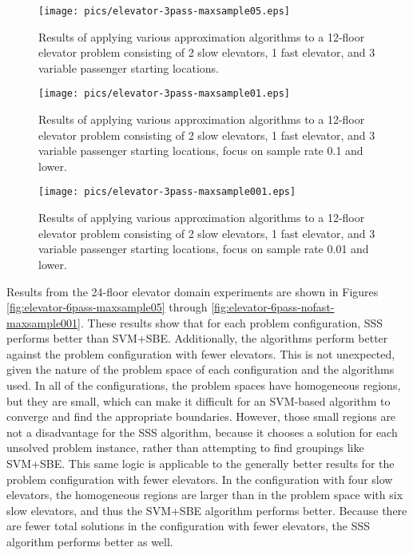 \begin{figure}
\begin{center}
\texttt{[image: pics/elevator-3pass-maxsample05.eps]}
\caption{Results of applying various approximation algorithms to a 12-floor elevator problem consisting of 2 slow elevators, 1 fast elevator, and 3 variable passenger starting locations.}
\label{fig:elevator-3pass-maxsample05}
\end{center}
\end{figure}

\begin{figure}
\begin{center}
\texttt{[image: pics/elevator-3pass-maxsample01.eps]}
\caption{Results of applying various approximation algorithms to a 12-floor elevator problem consisting of 2 slow elevators, 1 fast elevator, and 3 variable passenger starting locations, focus on sample rate 0.1 and lower.}
\label{fig:elevator-3pass-maxsample01}
\end{center}
\end{figure}

\begin{figure}
\begin{center}
\texttt{[image: pics/elevator-3pass-maxsample001.eps]}
\caption{Results of applying various approximation algorithms to a 12-floor elevator problem consisting of 2 slow elevators, 1 fast elevator, and 3 variable passenger starting locations, focus on sample rate 0.01 and lower.}
\label{fig:elevator-3pass-maxsample001}
\end{center}
\end{figure}





Results from the 24-floor elevator domain experiments are shown in Figures \ref{fig:elevator-6pass-maxsample05} through \ref{fig:elevator-6pass-nofast-maxsample001}.  These results show that for each problem configuration, SSS performs better than SVM+SBE.  Additionally, the algorithms perform better against the problem configuration with fewer elevators.  This is not unexpected,  given the nature of the problem space of each configuration and the algorithms used.  In all of the configurations, the problem spaces have homogeneous regions, but they are small, which can make it difficult for an SVM-based algorithm to converge and find the appropriate boundaries.  However, those small regions are not a disadvantage for the SSS algorithm, because it chooses a solution for each unsolved problem instance, rather than attempting to find groupings like SVM+SBE.  This same logic is applicable to the generally better results for the problem configuration with fewer elevators.  In the  configuration with four slow elevators, the homogeneous regions are larger than in the  problem space with six slow elevators, and thus the SVM+SBE algorithm performs better.  Because there are fewer total solutions in the configuration with fewer elevators, the SSS algorithm performs better as well.





